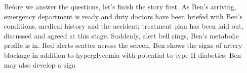 Before we answer the questions, let's finish the story first. As Ben's arriving, emergency department is ready and duty doctors have been briefed with Ben's conditions, medical history and the accident; treatment plan has been laid out, discussed and agreed at this stage. Suddenly, alert bell rings, Ben's metabolic profile is in. Red alerts scatter across the screen, Ben shows the signs of artery blockage in addition to hyperglycemia with potential to type II diabetics; Ben may also develop a sign